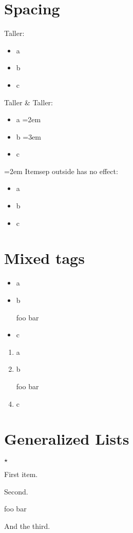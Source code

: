 \documentclass{article}
\begin{document}
\section{Spacing}
Taller:
\begin{itemize}
\itemsep=2em
\item a
\item b
\item c
\end{itemize}

Taller \& Taller:
\begin{itemize}
\item a
\itemsep=2em
\item b
\itemsep=3em
\item c
\end{itemize}

{\itemsep=2em
Itemsep outside has no effect:
\begin{itemize}
\item a
\item b
\item c
\end{itemize}}

\section{Mixed tags}
\begin{itemize}
\item a
\item b
\item[foo] bar
\item c
\end{itemize}

\begin{enumerate}
\item a
\item b
\item[foo] bar
\item c
\end{enumerate}

\section{Generalized Lists}
\begin{list}{$\star$}{}
   \item First item.
   \item Second.
   \item[foo] bar
   \item And the third.
\end{list}
\end{document}
